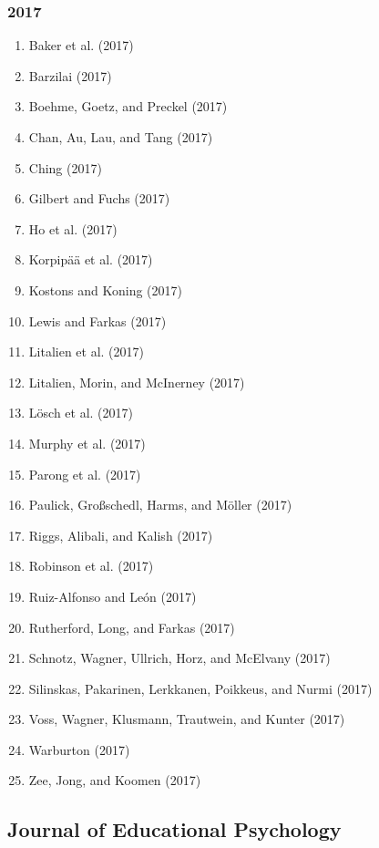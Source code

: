 \documentclass[english,man]{apa6}
\providecommand{\tightlist}{%
  \setlength{\itemsep}{0pt}\setlength{\parskip}{0pt}}
\begin{document}
\subsubsection{2017}\label{section-17}

\begin{enumerate}
\def\labelenumi{\arabic{enumi})}
\tightlist
\item
  Baker et al. (2017)
\item
  Barzilai (2017)
\item
  Boehme, Goetz, and Preckel (2017)
\item
  Chan, Au, Lau, and Tang (2017)
\item
  Ching (2017)
\item
  Gilbert and Fuchs (2017)
\item
  Ho et al. (2017)
\item
  Korpipää et al. (2017)
\item
  Kostons and Koning (2017)
\item
  Lewis and Farkas (2017)
\item
  Litalien et al. (2017)
\item
  Litalien, Morin, and McInerney (2017)
\item
  Lösch et al. (2017)
\item
  Murphy et al. (2017)
\item
  Parong et al. (2017)
\item
  Paulick, Großschedl, Harms, and Möller (2017)
\item
  Riggs, Alibali, and Kalish (2017)
\item
  Robinson et al. (2017)
\item
  Ruiz-Alfonso and León (2017)
\item
  Rutherford, Long, and Farkas (2017)
\item
  Schnotz, Wagner, Ullrich, Horz, and McElvany (2017)
\item
  Silinskas, Pakarinen, Lerkkanen, Poikkeus, and Nurmi (2017)
\item
  Voss, Wagner, Klusmann, Trautwein, and Kunter (2017)
\item
  Warburton (2017)
\item
  Zee, Jong, and Koomen (2017)
\end{enumerate}

\subsection{Journal of Educational
Psychology}\label{journal-of-educational-psychology}
\end{document}
